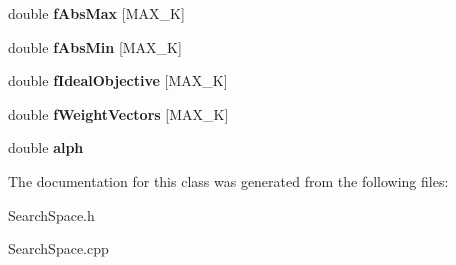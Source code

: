\begin{DoxyCompactItemize}
\item 
\hypertarget{class_search_space_acde764a3115751a5ed1115a7e50fcd7f}{}double {\bfseries f\+Abs\+Max} \mbox{[}M\+A\+X\+\_\+\+K\mbox{]}\label{class_search_space_acde764a3115751a5ed1115a7e50fcd7f}

\item 
\hypertarget{class_search_space_a92db60f95923e4d3014af355a97ef259}{}double {\bfseries f\+Abs\+Min} \mbox{[}M\+A\+X\+\_\+\+K\mbox{]}\label{class_search_space_a92db60f95923e4d3014af355a97ef259}

\item 
\hypertarget{class_search_space_a30cadf4eee1d22178b868dcf0b632c9d}{}double {\bfseries f\+Ideal\+Objective} \mbox{[}M\+A\+X\+\_\+\+K\mbox{]}\label{class_search_space_a30cadf4eee1d22178b868dcf0b632c9d}

\item 
\hypertarget{class_search_space_aafc9dd05304f5f6c9353cec1b0fc6e4b}{}double {\bfseries f\+Weight\+Vectors} \mbox{[}M\+A\+X\+\_\+\+K\mbox{]}\label{class_search_space_aafc9dd05304f5f6c9353cec1b0fc6e4b}

\item 
\hypertarget{class_search_space_a89a1a51cdde8c915d0a7fc7601c44a59}{}double {\bfseries alph}\label{class_search_space_a89a1a51cdde8c915d0a7fc7601c44a59}

\end{DoxyCompactItemize}


The documentation for this class was generated from the following files\+:\begin{DoxyCompactItemize}
\item 
Search\+Space.\+h\item 
Search\+Space.\+cpp\end{DoxyCompactItemize}
